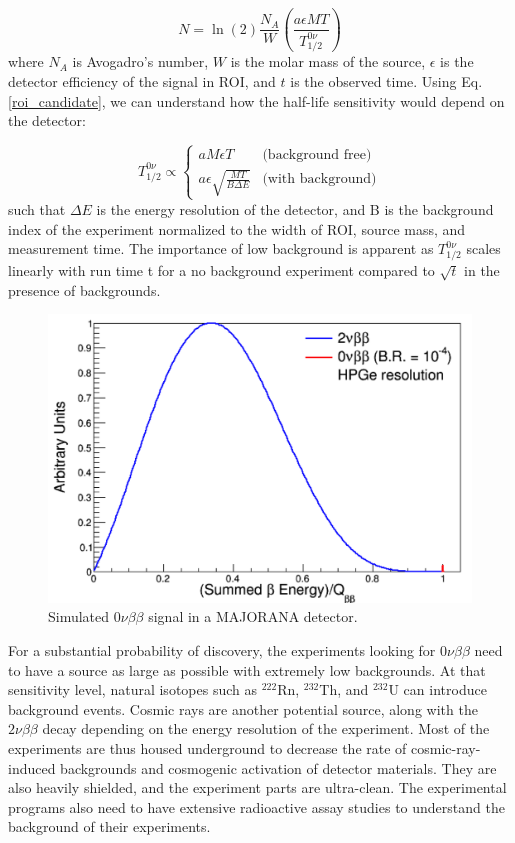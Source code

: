 \begin{equation}\label{roi_candidate}
N=\ln(2)\frac{N_A}{W}\left(\frac{a\epsilon MT}{T^{0\nu}_{1/2}}\right)
\end{equation}
where $N_A$ is Avogadro's number, $W$ is the molar mass of the source, $\epsilon$ is the detector efficiency of the signal in ROI, and $t$ is the observed time. Using Eq. \ref{roi_candidate}, we can understand how the half-life sensitivity would depend on the detector:

\begin{equation}\label{det_sensitivity}
T^{0\nu}_{1/2} \propto
    \begin{cases}
    aM\epsilon T & \text{(background free)}\\
    a\epsilon\sqrt{\frac{MT}{B\Delta E}} & \text{(with background)}
    \end{cases}       
\end{equation}
such that $\Delta E$ is the energy resolution of the detector, and B is the background index of the experiment normalized to the width of ROI, source mass, and measurement time. The importance of low background is apparent as $T^{0\nu}_{1/2}$ scales linearly with run time t for a no background experiment compared to $\sqrt{t}$ in the presence of backgrounds.


\begin{figure}
\centering
\includegraphics[width=0.8\linewidth]{ch1/figs/DoubleBetaEnergy.png}
\caption{Simulated $0\nu\beta\beta$ signal in a MAJORANA detector. \cite{mjd_background}}
\label{mjd_background_fig}
\end{figure}

For a substantial probability of discovery, the experiments looking for $0\nu\beta\beta$ need to have a source as large as possible with extremely low backgrounds. At that sensitivity level, natural isotopes such as $^{222}$Rn, $^{232}$Th, and $^{232}$U can introduce background events. Cosmic rays are another potential source, along with the $2\nu\beta\beta$ decay depending on the energy resolution of the experiment. Most of the experiments are thus housed underground to decrease the rate of cosmic-ray-induced backgrounds and cosmogenic activation of detector materials. They are also heavily shielded, and the experiment parts are ultra-clean. The experimental programs also need to have extensive radioactive assay studies to understand the background of their experiments.


